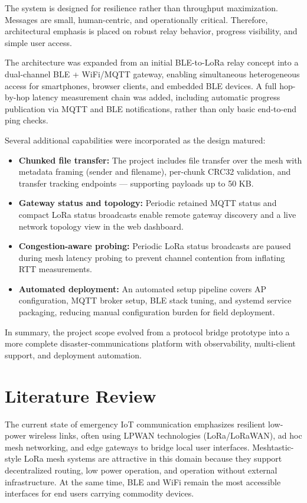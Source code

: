 \documentclass[conference]{IEEEtran}
\begin{document}
The system is designed for resilience rather than throughput maximization. Messages are small, human-centric, and operationally critical. Therefore, architectural emphasis is placed on robust relay behavior, progress visibility, and simple user access.

The architecture was expanded from an initial BLE-to-LoRa relay concept into a dual-channel BLE + WiFi/MQTT gateway, enabling simultaneous heterogeneous access for smartphones, browser clients, and embedded BLE devices. A full hop-by-hop latency measurement chain was added, including automatic progress publication via MQTT and BLE notifications, rather than only basic end-to-end ping checks.

Several additional capabilities were incorporated as the design matured:
\begin{itemize}
    \item \textbf{Chunked file transfer:} The project includes file transfer over the mesh with metadata framing (sender and filename), per-chunk CRC32 validation, and transfer tracking endpoints — supporting payloads up to 50 KB.
    \item \textbf{Gateway status and topology:} Periodic retained MQTT status and compact LoRa status broadcasts enable remote gateway discovery and a live network topology view in the web dashboard.
    \item \textbf{Congestion-aware probing:} Periodic LoRa status broadcasts are paused during mesh latency probing to prevent channel contention from inflating RTT measurements.
    \item \textbf{Automated deployment:} An automated setup pipeline covers AP configuration, MQTT broker setup, BLE stack tuning, and systemd service packaging, reducing manual configuration burden for field deployment.
\end{itemize}

In summary, the project scope evolved from a protocol bridge prototype into a more complete disaster-communications platform with observability, multi-client support, and deployment automation.

\section{Literature Review}
The current state of emergency IoT communication emphasizes resilient low-power wireless links, often using LPWAN technologies (LoRa/LoRaWAN), ad hoc mesh networking, and edge gateways to bridge local user interfaces. Meshtastic-style LoRa mesh systems are attractive in this domain because they support decentralized routing, low power operation, and operation without external infrastructure. At the same time, BLE and WiFi remain the most accessible interfaces for end users carrying commodity devices.
\end{document}
